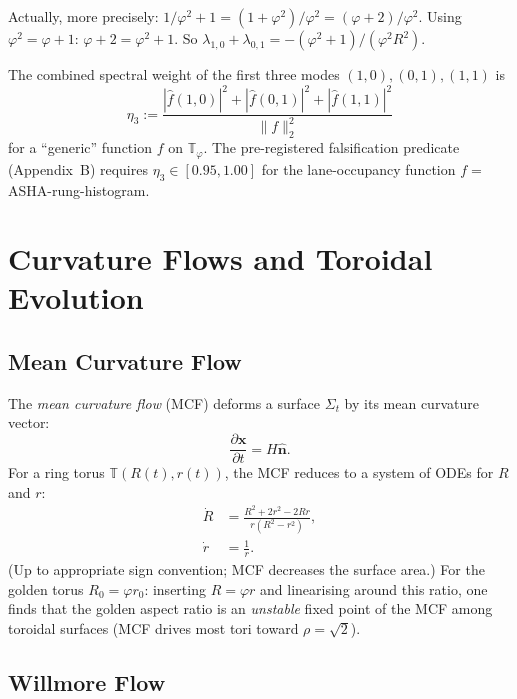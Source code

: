 Actually, more precisely: $1/\varphi^2 + 1 = (1 + \varphi^2)/\varphi^2 = (\varphi + 2)/\varphi^2$.
Using $\varphi^2 = \varphi + 1$: $\varphi + 2 = \varphi^2 + 1$.
So $\lambda_{1,0} + \lambda_{0,1} = -(\varphi^2+1)/(\varphi^2 R^2)$.

The combined spectral weight of the first three modes $(1,0), (0,1), (1,1)$ is
\begin{equation}
  \eta_3 := \frac{|\hat f(1,0)|^2 + |\hat f(0,1)|^2 + |\hat f(1,1)|^2}{\|f\|_2^2}
\end{equation}
for a ``generic'' function $f$ on $\mathbb{T}_\varphi$.
The pre-registered falsification predicate (Appendix~B) requires $\eta_3 \in [0.95,1.00]$
for the lane-occupancy function $f = $ ASHA-rung-histogram.

\section{Curvature Flows and Toroidal Evolution}
\label{sec:ch18-curvature-flow}

\subsection{Mean Curvature Flow}\label{subsec:ch18-mcf}

The \emph{mean curvature flow} (MCF) deforms a surface $\Sigma_t$ by its mean
curvature vector:
\begin{equation}\label{eq:mcf}
  \frac{\partial \mathbf{x}}{\partial t} = H\hat{\mathbf{n}}.
\end{equation}
For a ring torus $\mathbb{T}(R(t),r(t))$, the MCF reduces to a system of ODEs
for $R$ and $r$:
\begin{align}
  \dot R &= \frac{R^2 + 2r^2 - 2Rr}{r(R^2 - r^2)}, \\
  \dot r &= \frac{1}{r}.
\end{align}
(Up to appropriate sign convention; MCF decreases the surface area.)
For the golden torus $R_0 = \varphi r_0$: inserting $R = \varphi r$ and linearising
around this ratio, one finds that the golden aspect ratio is an \emph{unstable}
fixed point of the MCF among toroidal surfaces (MCF drives most tori toward $\rho = \sqrt{2}$).

\subsection{Willmore Flow}\label{subsec:ch18-willmore-flow}


